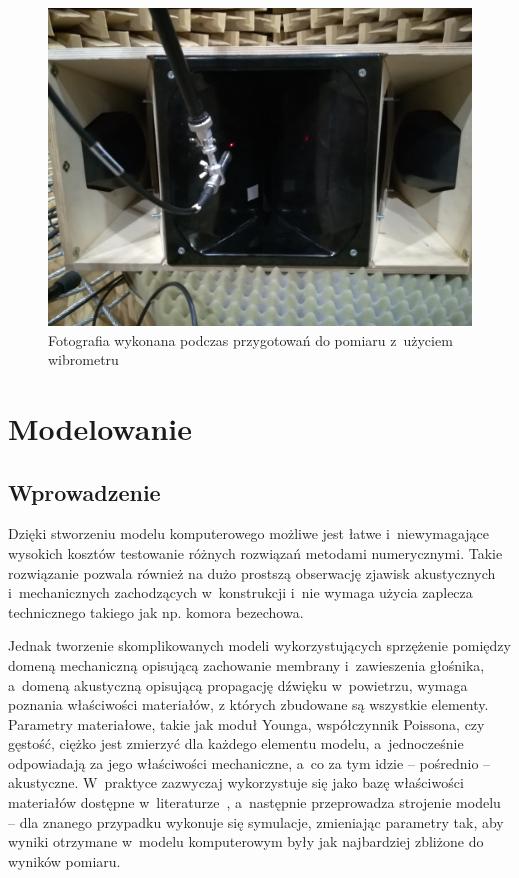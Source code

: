 \documentclass[12pt]{oska}
\begin{document}
			\begin{figure}[!ht]
				\centering
				\includegraphics[width=.7\textwidth]{zdjecie_wibro.jpg}
				\caption{Fotografia wykonana podczas przygotowań do pomiaru z~użyciem wibrometru}
				\label{r:wibro_zdjecie}
			\end{figure}


\section{Modelowanie}
	
	\subsection{Wprowadzenie}
	
		Dzięki stworzeniu modelu komputerowego możliwe jest łatwe i~niewymagające wysokich kosztów testowanie różnych rozwiązań metodami numerycznymi. Takie rozwiązanie pozwala również na dużo prostszą obserwację zjawisk akustycznych i~mechanicznych zachodzących w~konstrukcji i~nie wymaga użycia zaplecza technicznego takiego jak np. komora bezechowa. 
		
		Jednak tworzenie skomplikowanych modeli wykorzystujących sprzężenie pomiędzy domeną mechaniczną opisującą zachowanie membrany i~zawieszenia głośnika, a~domeną akustyczną opisującą propagację dźwięku w~powietrzu, wymaga poznania właściwości materiałów, z których zbudowane są wszystkie elementy. Parametry materiałowe, takie jak moduł Younga, współczynnik Poissona, czy gęstość, ciężko jest zmierzyć dla każdego elementu modelu, a~jednocześnie odpowiadają za jego właściwości mechaniczne, a~co za tym idzie -- pośrednio -- akustyczne. W~praktyce zazwyczaj wykorzystuje się jako bazę właściwości materiałów dostępne w~literaturze~\cite{modelowanie}, a~następnie przeprowadza strojenie modelu -- dla znanego przypadku wykonuje się symulacje, zmieniając parametry tak, aby wyniki otrzymane w~modelu komputerowym były jak najbardziej zbliżone do wyników pomiaru.
		
\end{document}
